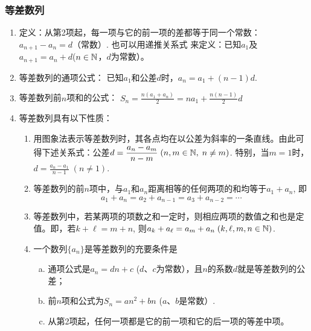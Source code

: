 \subsubsection{等差数列}
\begin{enumerate}
    \item 定义：从第2项起，每一项与它的前一项的差都等于同一个常数：$a_{n+1}-a_n=d$（常数）. 也可以用递推关系式
    来定义：已知$a_1$及$a_{n+1}=a_n+d$($n\in\mathbb{N}$，$d$为常数）。
   \item 等差数列的通项公式：
    已知$a_1$和公差$d$时，$a_n=a_1+(n-1)d$.
    \item 等差数列前$n$项和的公式：
    $S_n=\frac{n(a_1+a_n)}{2}=na_1+\frac{n(n-1)}{2}d$
    \item 等差数列具有以下性质：
\begin{enumerate}[(1)]
\item 用图象法表示等差数列时，其各点均在以公差为斜率的一条直线。由此可得下述关系式：公差$d=\dfrac{a_n-a_m}{n-m}\; (n,m\in\mathbb{N},\; n\ne m)$. 特别，当$m=1$时，$d=\frac{a_n-a_1}{n-1}\; (n\ne1)$.
    \item 等差数列的前$n$项中，与$a_1$和$a_n$距离相等的任何两项的和均等于$a_1+a_n$, 即
  \[  a_1+a_n=a_2+a_{n-1}=a_3+a_{n-2}=\cdots\]
    \item 等差数列中，若某两项的项数之和一定时，则相应两项的数值之和也是定值。即，若$k+\ell=m+n$, 则$a_k+a_{\ell}=a_m+a_n\; (k,\ell,m,n\in\mathbb{N})$.
    \item 一个数列$\{a_n\}$是等差数列的充要条件是
\begin{enumerate}[(a)]
\item 通项公式是$a_n=dn+c$ ($d$、$c$为常数），且$n$的系数$d$就是等差数列的公差；
\item 前$n$项和公式为$S_n=an^2+bn$ ($a$、$b$是常数）.
\item 从第2项起，任何一项都是它的前一项和它的后一项的等差中项。 
\end{enumerate}
\end{enumerate}
\end{enumerate}


